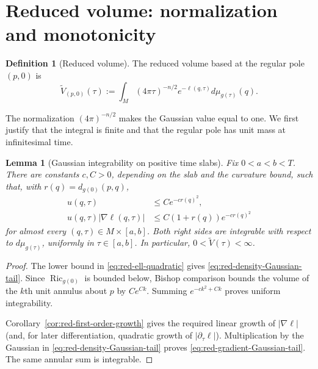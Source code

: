 \documentclass[10pt]{coll-l}
\newtheorem{lemma}[theorem]{Lemma}
\theoremstyle{definition}
\newtheorem{definition}[theorem]{Definition}
\theoremstyle{remark}
\numberwithin{section}{chapter}
\numberwithin{equation}{chapter}
\newcommand{\Ric}{\operatorname{Ric}}
\begin{document}
\section{Reduced volume: normalization and monotonicity}
\label{sec:red-volume}

\begin{definition}[Reduced volume]
\label{def:red-volume}
The reduced volume based at the regular pole $(p,0)$ is
\begin{equation}
             \widetilde V_{(p,0)}(\tau)
       :=\int_M(4\pi\tau)^{-n/2}e^{-\ell(q,\tau)}
                    d\mu_{g(\tau)}(q).                  \label{eq:red-volume}
\end{equation}
\end{definition}

The normalization $(4\pi)^{-n/2}$ makes the Gaussian value equal to one.
We first justify that the integral is finite and that the regular pole has
unit mass at infinitesimal time.

\begin{lemma}[Gaussian integrability on positive time slabs]
\label{lem:red-Gaussian-integrability}
Fix $0<a<b<T$.  There are constants $c,C>0$, depending on the slab and the
curvature bound, such that, with $r(q)=d_{g(0)}(p,q)$,
\begin{align}
 u(q,\tau)&\leq Ce^{-cr(q)^2},                           \label{eq:red-density-Gaussian-tail}\\
 u(q,\tau)|\nabla\ell(q,\tau)|
       &\leq C(1+r(q))e^{-cr(q)^2}                       \label{eq:red-gradient-Gaussian-tail}
\end{align}
for almost every $(q,\tau)\in M\times[a,b]$.  Both right sides are
integrable with respect to $d\mu_{g(\tau)}$, uniformly in $\tau\in[a,b]$.
In particular, $0<\widetilde V(\tau)<\infty$.
\end{lemma}

\begin{proof}
The lower bound in \eqref{eq:red-ell-quadratic} gives
\eqref{eq:red-density-Gaussian-tail}.  Since $\Ric_{g(0)}$ is bounded below,
Bishop comparison bounds the volume of the $k$th unit annulus about $p$ by
$Ce^{Ck}$.  Summing $e^{-ck^2+Ck}$ proves uniform integrability.

Corollary~\ref{cor:red-first-order-growth} gives the required linear growth
of $|\nabla\ell|$ (and, for later differentiation, quadratic growth of
$|\partial_\tau\ell|$).  Multiplication by the Gaussian in
\eqref{eq:red-density-Gaussian-tail} proves
\eqref{eq:red-gradient-Gaussian-tail}.  The same annular sum is integrable.
\end{proof}
\end{document}
